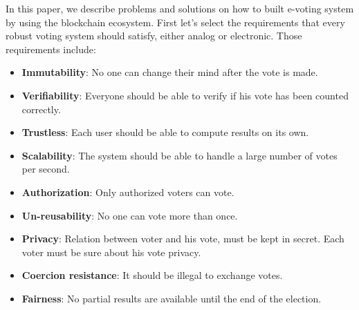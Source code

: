 \documentclass[runningheads]{llncs}
\begin{document}
In this paper, we describe problems and solutions on how to built e-voting system by 
using the  blockchain ecosystem. 
First let's select   the requirements that every robust voting system should satisfy, either analog or electronic. Those requirements include:
\begin{itemize}
\item \textbf{Immutability}: No one can change their mind after the vote is made.
\item \textbf{Verifiability}: Everyone should be able to verify if his vote has been counted correctly.
\item \textbf{Trustless}: Each user should be able to compute results on its own.
\item \textbf{Scalability}: The system should be able to handle a large number of votes per second.
\item \textbf{Authorization}: Only authorized voters can vote.
\item \textbf{Un-reusability}: No one can vote more than once.
\item \textbf{Privacy}: Relation between voter and his vote, must be kept in secret. Each voter must be sure about his vote privacy. 
\item \textbf{Coercion resistance}: It should be illegal to exchange votes.
\item \textbf{Fairness}: No partial results are available until the end of the election.
\end{itemize}
\end{document}
